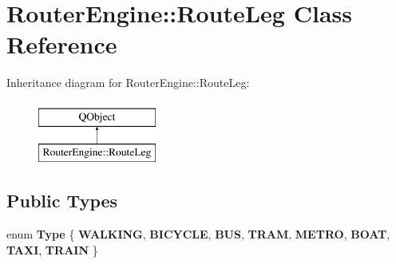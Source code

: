 \hypertarget{classRouterEngine_1_1RouteLeg}{}\section{Router\+Engine\+:\+:Route\+Leg Class Reference}
\label{classRouterEngine_1_1RouteLeg}
Inheritance diagram for Router\+Engine\+:\+:Route\+Leg\+:\begin{figure}[H]
\begin{center}
\leavevmode
\includegraphics[height=2.000000cm]{classRouterEngine_1_1RouteLeg}
\end{center}
\end{figure}
\subsection*{Public Types}
\begin{DoxyCompactItemize}
\item 
\mbox{\label{classRouterEngine_1_1RouteLeg_acdcc25212c113c641ee3fbaebb52a7bd}} 
enum {\bfseries Type} \{ \newline
{\bfseries W\+A\+L\+K\+I\+NG}, 
{\bfseries B\+I\+C\+Y\+C\+LE}, 
{\bfseries B\+US}, 
{\bfseries T\+R\+AM}, 
\newline
{\bfseries M\+E\+T\+RO}, 
{\bfseries B\+O\+AT}, 
{\bfseries T\+A\+XI}, 
{\bfseries T\+R\+A\+IN}
 \}
\end{DoxyCompactItemize}
